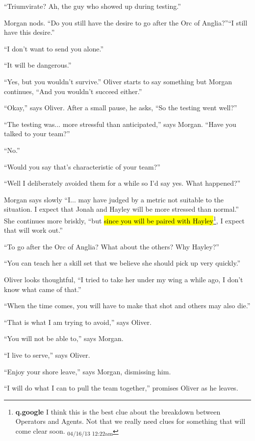 ``Triumvirate?  Ah, the guy who showed up during testing.''

Morgan nods.  ``Do you still have the desire to go after the Orc of Anglia?''``I still have this desire.''

``I don't want to send you alone.''

``It will be dangerous.''

``Yes, but you wouldn't survive.''  Oliver starts to say something but Morgan continues, ``And you wouldn't succeed either.''

``Okay,'' says Oliver.  After a small pause, he asks, ``So the testing went well?''

``The testing was... more stressful than anticipated,'' says Morgan. ``Have you talked to your team?''

``No.''

``Would you say that's characteristic of your team?''

``Well I deliberately avoided them for a while so I'd say yes.  What happened?''

Morgan says slowly ``I... may have judged by a metric not suitable to the situation.  I expect that Jonah and Hayley will be more stressed than normal.''  She continues more briskly, ``but \hl{since you will be paired with Hayley}\footnote{\textbf{q.google }I think this is the best clue about the breakdown between Operators and Agents.  Not that we really need clues for something that will come clear soon. \textsubscript{04/16/13 12:22am}}, I expect that will work out.''

``To go after the Orc of Anglia?  What about the others?  Why Hayley?''

``You can teach her a skill set that we believe she should pick up very quickly.''

Oliver looks thoughtful, ``I tried to take her under my wing a while ago, I don't know what came of that.''

``When the time comes, you will have to make that shot and others may also die.''

``That is what I am trying to avoid,'' says Oliver.

``You will not be able to,'' says Morgan.

``I live to serve,'' says Oliver.

``Enjoy your shore leave,'' says Morgan, dismissing him.

``I will do what I can to pull the team together,'' promises Oliver as he leaves.



